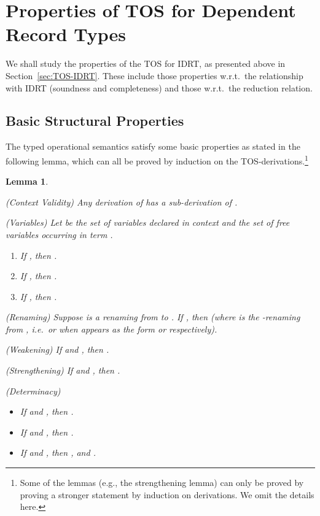 \documentclass[submission,copyright,creativecommons]{eptcs}
\newcommand{\selfcomment}[1]{\ifodd 0 {\sf #1 }\fi}
\newcommand{\selfc}{\selfcomment}
\newtheorem{lemma}[definition]{Lemma}
\newcommand{\eg}{{e.g.}}
\newcommand{\wrt}{{w.r.t.}}
\begin{document}
\section{Properties of TOS for Dependent Record Types}
\label{sec:metaTOS}

We shall study the properties of the TOS for IDRT, as presented above in Section~\ref{sec:TOS-IDRT}.  These include those properties \wrt\ the relationship with IDRT (soundness and completeness) and those \wrt\ the reduction relation.
\subsection{Basic Structural Properties}
\label{subsec:struc}

The typed operational semantics satisfy some basic properties as stated in the following lemma, which can all be proved by induction on the TOS-derivations.\footnote{Some of the lemmas (\eg, the strengthening lemma) can only be proved by proving a stronger statement by induction on derivations.  We omit the details here.}

\begin{lemma} \label{Stru-prop}\
\begin{enumerate}
  \item (Context Validity) Any derivation of  has a sub-derivation of .
  \item (Variables) Let  be the set of variables declared in context  and  the set of free variables occurring in term .
  \begin{enumerate}
    \item If , then .
    \item If , then .
    \item If , then .
  \end{enumerate}
\selfc{\item (Renaming) Suppose  is a renaming from  to . If , then  (where  is the -renaming from , i.e.\  or  when  appears as the form  or  respectively).
}\item (Weakening) If  and , then .
  \item (Strengthening) If  and , then .
  \item (Determinacy) \label{UNF}
  \begin{itemize}
    \item If  and , then .
    \item If  and , then .
    \item If  and , then ,  and .
  \end{itemize}
\end{enumerate}
\end{lemma}
\end{document}
